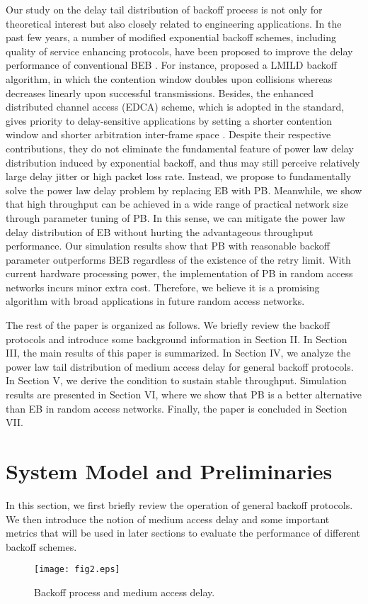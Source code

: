 \documentclass[journal]{IEEEtran}
\begin{document}
Our study on the delay tail distribution of backoff process is not only for theoretical interest but also closely related to engineering applications. In the past few years, a number of modified exponential backoff schemes, including quality of service enhancing protocols, have been proposed to improve the delay performance of conventional BEB \cite{2004:Deng,2008:Barcelo,2003:Mangold}. For instance, \cite{2004:Deng} proposed a LMILD backoff algorithm, in which the contention window doubles upon collisions whereas decreases linearly upon successful transmissions. Besides, the enhanced distributed channel access (EDCA) scheme, which is adopted in the  standard, gives priority to delay-sensitive applications by setting a shorter contention window and shorter arbitration inter-frame space \cite{2003:Mangold}. Despite their respective contributions, they do not eliminate the fundamental feature of power law delay distribution induced by exponential backoff, and thus may still perceive relatively large delay jitter or high packet loss rate. Instead, we propose to fundamentally solve the power law delay problem by replacing EB with PB. Meanwhile, we show that high throughput can be achieved in a wide range of practical network size through parameter tuning of PB. In this sense, we can mitigate the power law delay distribution of EB without hurting the advantageous throughput performance. Our simulation results show that PB with reasonable backoff parameter outperforms BEB regardless of the existence of the retry limit. With current hardware processing power, the implementation of PB in random access networks incurs minor extra cost. Therefore, we believe it is a promising algorithm with broad applications in future random access networks.

The rest of the paper is organized as follows. We briefly review the backoff protocols and introduce some background information in Section II. In Section III, the main results of this paper is summarized. In Section IV, we analyze the power law tail distribution of medium access delay for general backoff protocols. In Section V, we derive the condition to sustain stable throughput. Simulation results are presented in Section VI, where we show that PB is a better alternative than EB in random access networks. Finally, the paper is concluded in Section VII.

\section{System Model and Preliminaries}
In this section, we first briefly review the operation of general backoff protocols. We then introduce the notion of medium access delay and some important metrics that will be used in later sections to evaluate the performance of different backoff schemes.
\begin{figure}
\centering
  \begin{center}
    \texttt{[image: fig2.eps]}
  \end{center}
  \caption{Backoff process and medium access delay.}
  \label{52}
\end{figure}
\end{document}
